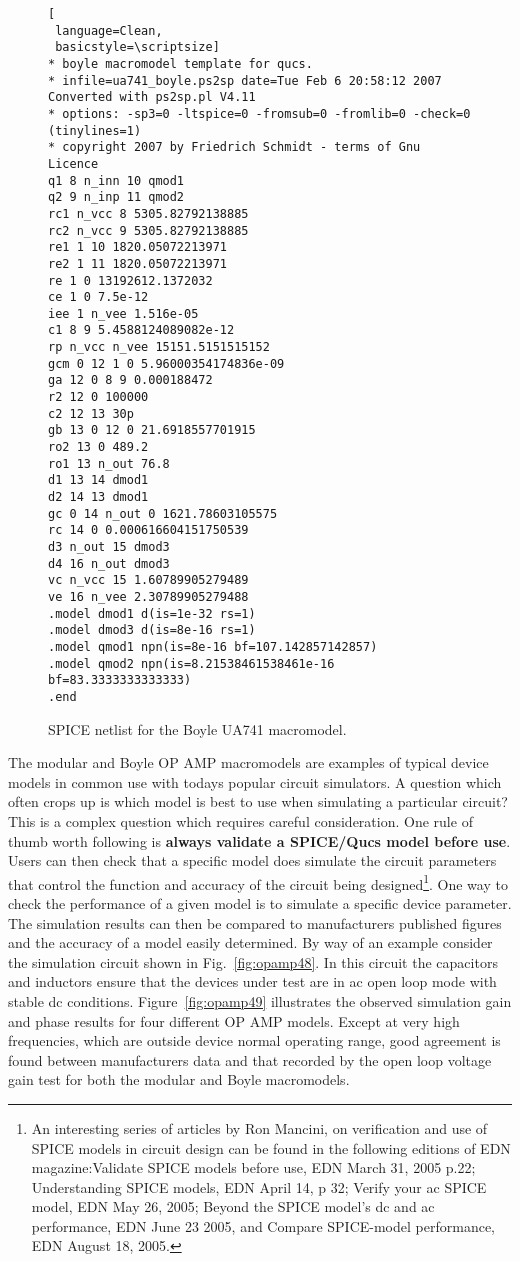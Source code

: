 \begin{figure} 
  \centering
\begin{lstlisting}[
 language=Clean, 
 basicstyle=\scriptsize]
* boyle macromodel template for qucs.
* infile=ua741_boyle.ps2sp date=Tue Feb 6 20:58:12 2007 Converted with ps2sp.pl V4.11
* options: -sp3=0 -ltspice=0 -fromsub=0 -fromlib=0 -check=0 (tinylines=1)
* copyright 2007 by Friedrich Schmidt - terms of Gnu Licence
q1 8 n_inn 10 qmod1
q2 9 n_inp 11 qmod2
rc1 n_vcc 8 5305.82792138885
rc2 n_vcc 9 5305.82792138885
re1 1 10 1820.05072213971
re2 1 11 1820.05072213971
re 1 0 13192612.1372032
ce 1 0 7.5e-12
iee 1 n_vee 1.516e-05
c1 8 9 5.4588124089082e-12
rp n_vcc n_vee 15151.5151515152
gcm 0 12 1 0 5.96000354174836e-09
ga 12 0 8 9 0.000188472
r2 12 0 100000
c2 12 13 30p
gb 13 0 12 0 21.6918557701915
ro2 13 0 489.2
ro1 13 n_out 76.8
d1 13 14 dmod1
d2 14 13 dmod1
gc 0 14 n_out 0 1621.78603105575
rc 14 0 0.000616604151750539
d3 n_out 15 dmod3
d4 16 n_out dmod3
vc n_vcc 15 1.60789905279489
ve 16 n_vee 2.30789905279488
.model dmod1 d(is=1e-32 rs=1)
.model dmod3 d(is=8e-16 rs=1)
.model qmod1 npn(is=8e-16 bf=107.142857142857)
.model qmod2 npn(is=8.21538461538461e-16 bf=83.3333333333333)
.end
\end{lstlisting}
  \caption{SPICE netlist for the Boyle UA741 macromodel. } 
  \label{fig:opamp47}
\end{figure}


The modular and Boyle OP AMP macromodels are examples of typical device models in common use with todays popular circuit simulators. A question which often crops up is which model is best to use when simulating a particular circuit? This is a complex question which requires careful consideration. One rule of thumb worth following is \textbf{always validate a SPICE/Qucs model before use}. Users can then check that a specific model does simulate the circuit parameters that control the function and accuracy of the circuit being designed\footnote{An interesting series of articles by Ron Mancini, on verification and use of SPICE models in circuit design can be found in the following editions of EDN magazine:Validate SPICE models before use, EDN March 31, 2005 p.22; Understanding SPICE models, EDN April 14, p 32; Verify your ac SPICE model, EDN May 26, 2005; Beyond the SPICE model's dc and ac performance, EDN June 23 2005, and Compare SPICE-model performance, EDN August 18, 2005.}. One way to check the performance of a given model is to simulate a specific device parameter.  The simulation results can then be compared to manufacturers published figures and the accuracy of a model easily determined.  By way of an example consider the simulation circuit shown in Fig.~\ref{fig:opamp48}.  In this circuit the capacitors and inductors ensure that the devices under test are in ac open loop mode with stable dc conditions.  Figure~\ref{fig:opamp49} illustrates the observed simulation gain and phase results for four different OP AMP models.  Except at very high frequencies, which are outside device normal operating range, good agreement is found between manufacturers data and that recorded by the open loop voltage gain test for both the modular and Boyle macromodels.

